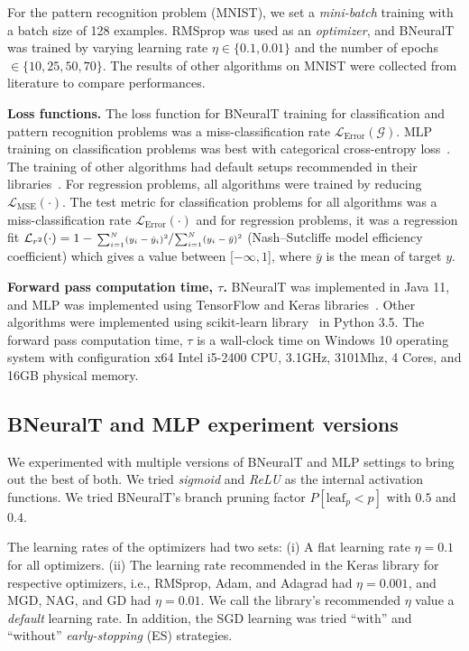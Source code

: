 \documentclass[11pt,a4paper]{article}
\begin{document}
    For the pattern recognition problem (MNIST), we set a  \textit{mini-batch} training with a batch size of 128 examples. RMSprop was used as an \textit{optimizer}, and BNeuralT was trained by varying learning rate $ \eta \in \{0.1, 0.01\}$ and the number of epochs $\in \{10, 25, 50, 70\}$. The results of other algorithms on MNIST were collected from literature to compare performances.
    
    \textbf{Loss functions.}
    The loss function for BNeuralT training for classification and pattern recognition problems was a miss-classification rate $\mathcal{L}_{\text{Error}}(\mathcal{G})$. MLP training on classification problems was best with categorical cross-entropy loss~\citep{bishop2006pattern}. The training of other algorithms had default setups recommended in their libraries~\citep{pedregosa2011scikit}. For regression problems, all algorithms were trained by reducing  $\mathcal{L}_{\text{MSE}}(\mathcal{\cdot})$. 
The test metric for classification problems for all algorithms was a miss-classification rate $\mathcal{L}_{\text{Error}}(\mathcal{\cdot})$ and for regression problems, it was a regression fit $\mathcal{L}_{r^2}(\mathcal{\cdot}) = 1 - \sfrac{\sum_{i=1}^{N} (y_i - \hat{y}_i)^2}{\sum_{i=1}^{N} (y_i - \bar{y})^2}$ (Nash–Sutcliffe model efficiency coefficient) which gives a value between [$- \infty, 1$], where $\bar{y} $ is the mean of target $y$.
    
    \textbf{Forward pass computation time, $\tau$.} BNeuralT was implemented in Java 11, and MLP was implemented using TensorFlow and Keras libraries~\citep{kerasSequential}. Other algorithms were implemented using scikit-learn library~\citep{pedregosa2011scikit} in Python 3.5. The forward pass computation time, $ \tau $ is a wall-clock time on Windows 10 operating system with configuration x64 Intel i5-2400 CPU, 3.1GHz, 3101Mhz, 4 Cores, and 16GB physical memory.
    
    \subsection{BNeuralT and MLP experiment versions}
    \label{sec:exp_version}
    We experimented with multiple versions of BNeuralT and MLP settings to bring out the best of both. We tried \textit{sigmoid} and \textit{ReLU} as the internal activation functions. We tried BNeuralT's branch pruning factor $ P[\text{leaf}_{p} < p]$ with $0.5$ and $0.4$. 
    
    The learning rates of the optimizers had two sets: (i) A flat learning rate $\eta = 0.1$ for all optimizers. (ii) The learning rate recommended in the Keras library for respective optimizers, i.e., RMSprop, Adam, and Adagrad had $\eta=0.001$, and MGD, NAG, and GD had  $\eta=0.01$. We call the library's recommended $\eta$ value a \textit{default} learning rate. In addition, the SGD learning was tried ``with'' and ``without'' \textit{early-stopping} (ES) strategies.
    
\end{document}
